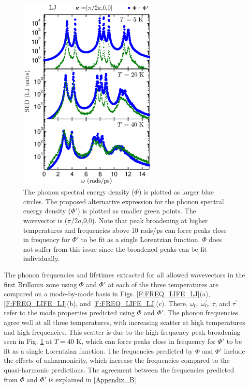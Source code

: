 \documentclass[12pt,twocolumn,iop]{/usr/share/texmf-texlive/tex/latex/iop/iopart}[/usr/share/texmf-texlive/tex/latex/iop/]
\begin{document}
\begin{figure}
\begin{center}
\includegraphics[angle=0,width=70.0mm]{figure2.eps}
\vspace*{0mm}
\end{center}
\caption{\label{F:PEAK_COMPARE} The phonon spectral energy density ($\Phi$) is plotted as larger blue circles.  The proposed alternative expression for the phonon spectral energy density ($\Phi'$) is plotted as smaller green points. The wavevector is ($\pi/2a$,0,0). Note that peak broadening at higher temperatures and frequencies above $10$ rads/ps can force peaks close in frequency for $\Phi'$ to be fit as a single Lorentzian function. $\Phi$ does not suffer from this issue since the broadened peaks can be fit individually.}
\end{figure}

The phonon frequencies and lifetimes extracted for all allowed wavevectors in the first Brillouin zone using $\Phi$ and $\Phi'$ at each of the three temperatures are compared on a mode-by-mode basis in Figs$.$ \ref{F:FREQ_LIFE_LJ}(a), \ref{F:FREQ_LIFE_LJ}(b), and \ref{F:FREQ_LIFE_LJ}(c). There, $\omega_0$, $\omega_0^{'}$, $\tau$, and $\tau^{'}$  refer to the mode properties predicted using $\Phi$ and $\Phi'$. The phonon frequencies agree well at all three temperatures, with increasing scatter at high temperatures and high frequencies.  This scatter is due to the high-frequency peak broadening seen in Fig$.$ \ref{F:PEAK_COMPARE} at $T = 40$ K, which can force peaks close in frequency for $\Phi'$ to be fit as a single Lorentzian function. The frequencies predicted by $\Phi$ and $\Phi'$ include the effects of anharmonicity, which increase the frequencies compared to the quasi-harmonic predictions.\cite{mcgaughey2004c,turney2009a} The agreement between the frequencies predicted from $\Phi$ and $\Phi'$ is explained in \ref{Appendix_B}.
\end{document}
